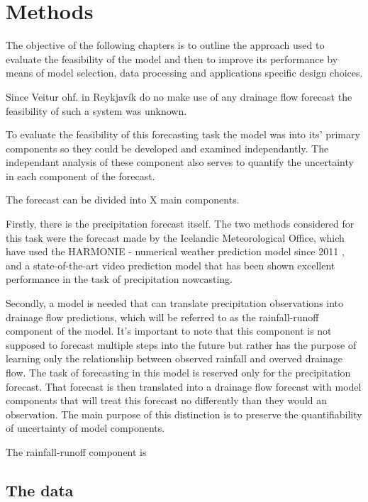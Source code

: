 \chapter{Methods} \label{sec:Methods}
The objective of the following chapters is to outline the approach used to evaluate the feasibility of the model and then to improve its performance by means of model selection, data processing and applications specific design choices. 

Since Veitur ohf. in Reykjavík do no make use of any drainage flow forecast the feasibility of such a system was unknown. 

To evaluate the feasibility of this forecasting task the model was into its' primary components so they could be developed and examined independantly. The independant analysis of these component also serves to quantify the uncertainty in each component of the forecast.

The forecast can be divided into X main components. 

Firstly, there is the precipitation forecast itself. The two methods considered for this task were the forecast made by the Icelandic Meteorological Office, which have used the HARMONIE - numerical weather prediction model since 2011 \cite{vedurstofaharmonie}, and a state-of-the-art video prediction model that has been shown excellent performance in the task of precipitation nowcasting. 

Secondly, a model is needed that can translate precipitation observations into drainage flow predictions, which will be referred to as the rainfall-runoff component of the model. It's important to note that this component is not supposed to forecast multiple steps into the future but rather has the purpose of learning only the relationship between observed rainfall and overved drainage flow. The task of forecasting in this model is reserved only for the precipitation forecast. That forecast is then translated into a drainage flow forecast with model components that will treat this forecast no differently than they would an observation. The main purpose of this distinction is to preserve the quantifiability of uncertainty of model components. 

The rainfall-runoff component is  




\section{The data}

